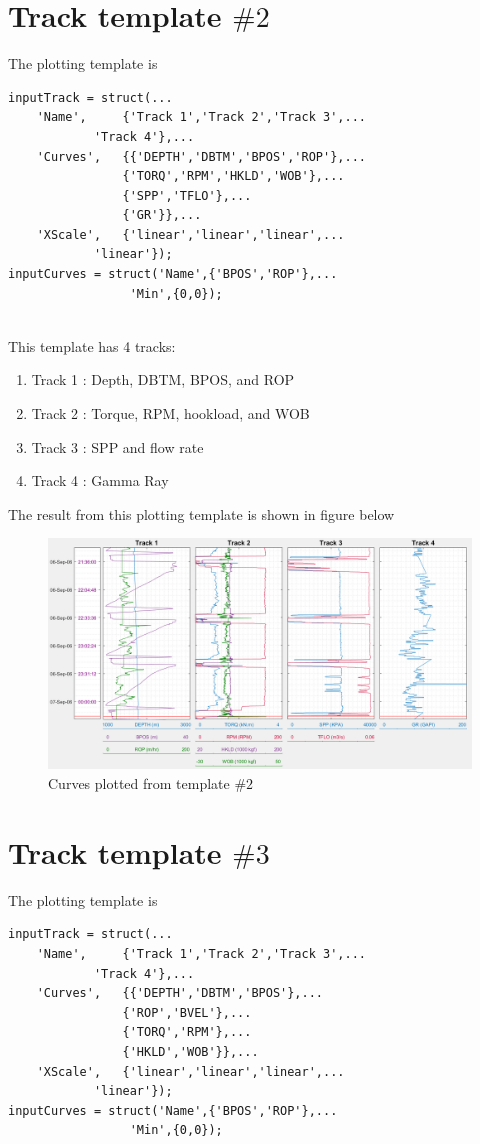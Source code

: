 \documentclass[12pt,a4paper,oneside]{report}
\begin{document}
\pagebreak
\section{Track template $\#2$}
The plotting template is
\begin{lstlisting}[style=Matlab-editor]
inputTrack = struct(...
    'Name',     {'Track 1','Track 2','Track 3',...
    		'Track 4'},...
    'Curves',   {{'DEPTH','DBTM','BPOS','ROP'},...
                {'TORQ','RPM','HKLD','WOB'},...
                {'SPP','TFLO'},...
                {'GR'}},...
    'XScale',   {'linear','linear','linear',...
    		'linear'});
inputCurves = struct('Name',{'BPOS','ROP'},...
    		     'Min',{0,0});
    
\end{lstlisting}

\noindent This template has 4 tracks:
\begin{enumerate}
\setlength\itemsep{0.1em}
\item Track 1 : Depth, DBTM, BPOS, and ROP
\item Track 2 : Torque, RPM, hookload, and WOB
\item Track 3 : SPP and flow rate
\item Track 4 : Gamma Ray
\end{enumerate}

\noindent The result from this plotting template is shown in figure below
\begin{figure}[H]
\centering
\includegraphics[width=\textwidth]{example2.PNG}
\caption{Curves plotted from template $\#2$}
\end{figure}

\pagebreak
\section{Track template $\#3$}
The plotting template is
\begin{lstlisting}[style=Matlab-editor]
inputTrack = struct(...
    'Name',     {'Track 1','Track 2','Track 3',...
    		'Track 4'},...
    'Curves',   {{'DEPTH','DBTM','BPOS'},...
                {'ROP','BVEL'},...
                {'TORQ','RPM'},...
                {'HKLD','WOB'}},...
    'XScale',   {'linear','linear','linear',...
    		'linear'});
inputCurves = struct('Name',{'BPOS','ROP'},...
    		     'Min',{0,0});
    
\end{lstlisting}
\end{document}
